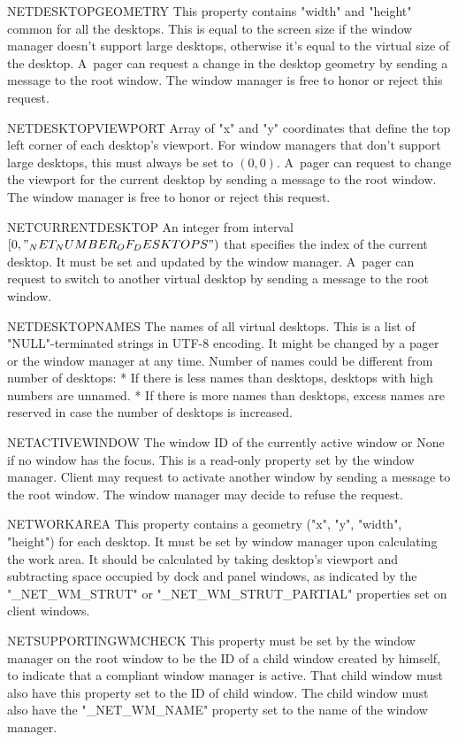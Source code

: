 \heading \uns NET\uns DESKTOP\uns GEOMETRY
This property contains "width" and "height" common for all the desktops.
This is equal to the screen size if the window manager doesn't support large desktops, otherwise it's equal to the virtual size of the desktop.
A~pager can request a change in the desktop geometry by sending a message to the root window.
The window manager is free to honor or reject this request.

\heading \uns NET\uns DESKTOP\uns VIEWPORT
Array of "x" and "y" coordinates that define the top left corner of each desktop's viewport.
For window managers that don't support large desktops, this must always be set to $(0,0)$.
A~pager can request to change the viewport for the current desktop by sending a message to the root window.
The window manager is free to honor or reject this request.

\heading \uns NET\uns CURRENT\uns DESKTOP
An integer from interval $[0,"_NET_NUMBER_OF_DESKTOPS")$ that specifies the index of the current desktop.
It must be set and updated by the window manager.
A~pager can request to switch to another virtual desktop by sending a message to the root window.

\heading \uns NET\uns DESKTOP\uns NAMES
The names of all virtual desktops.
This is a list of "NULL"-terminated strings in UTF-8 encoding.
It might be changed by a pager or the window manager at any time.
Number of names could be different from number of desktops:
\begitems
* If there is less names than desktops, desktops with high numbers are unnamed.
* If there is more names than desktops, excess names are reserved in case the number of desktops is increased.
\enditems

\heading \uns NET\uns ACTIVE\uns WINDOW
The window ID of the currently active window or None if no window has the focus.
This is a read-only property set by the window manager.
Client may request to activate another window by sending a message to the root window.
The window manager may decide to refuse the request.

\heading \uns NET\uns WORKAREA
This property contains a geometry ("x", "y", "width", "height") for each desktop.
It must be set by window manager upon calculating the work area.
It should be calculated by taking desktop's viewport and subtracting space occupied by dock and panel windows,
as indicated by the "_NET_WM_STRUT" or "_NET_WM_STRUT_PARTIAL" properties set on client windows.

\heading \uns NET\uns SUPPORTING\uns WM\uns CHECK
This property must be set by the window manager on the root window to be the ID of a child window created
by himself, to indicate that a compliant window manager is active.
That child window must also have this property set to the ID of child window.
The child window must also have the "_NET_WM_NAME" property set to the name of the window manager.

